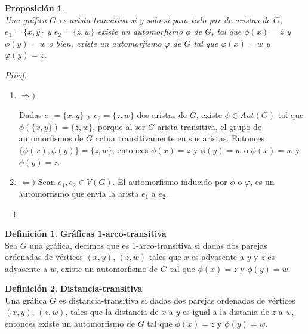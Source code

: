 \documentclass[12pt]{book}
\newtheorem{proposition}{Proposición}
\theoremstyle{definition}
\newtheorem{definition}{Definición}
\begin{document}
\begin{proposition}\textbf{}\\
  Una gráfica $G$ es arista-transitiva si y solo si para todo par de
  aristas de $G$, $e_1=\{x,y\}$ y $e_2=\{z,w\}$ existe un automorfismo
  $\phi$ de $G$, tal que $\phi(x)=z$ y $\phi(y)=w$ o bien, existe un
  automorfismo $\varphi$ de $G$ tal que $\varphi(x)=w$ y
  $\varphi(y)=z$.
\end{proposition}

\begin{proof}

\begin{enumerate}

\item $\Rightarrow)$

Dadas $e_1=\{x,y\}$ y $e_2=\{z,w\}$ dos aristas de $G$,
existe $\phi\in Aut(G)$ tal que $\phi(\{x,y\})=\{z,w\}$, porque al ser
$G$ arista-transitiva, el grupo de automorfismos de $G$ actua
transitivamente en sus aristas. Entonces
$\{\phi(x),\phi(y)\}=\{z,w\}$, entonces $\phi(x)=z$ y $\phi(y)=w$ o
$\phi(x)=w$ y $\phi(y)=z$.

\item
$\Leftarrow)$
Sean $e_1,e_2\in V(G)$. El automorfismo inducido por $\phi$ o $\varphi$, es un
automorfismo que envía la arista $e_1$ a $e_2$.
\end{enumerate}
\end{proof}



\begin{definition}\textbf{Gráficas 1-arco-transitiva}\\
  Sea $G$ una gráfica, decimos que es 1-arco-transitiva si dadas dos
  parejas ordenadas de vértices $(x,y)$, $(z,w)$ tales que $x$
  es adyasente a $y$ y
  $z$ es adyasente a $w$, existe un automorfismo de $G$ tal que $\phi(x)=z$ y
  $\phi(y)=w$.
\end{definition}



\begin{definition}\textbf{Distancia-transitiva}\\
  Una gráfica $G$ es distancia-transitiva si dadas dos
  parejas ordenadas de vértices $(x,y)$, $(z,w)$, tales que la distancia de $x$
  a $y$ es igual a la distania de $z$ a $w$,
  entonces existe un automorfismo de $G$ tal que $\phi(x)=z$ y
  $\phi(y)=w$.
\end{definition}
\end{document}
